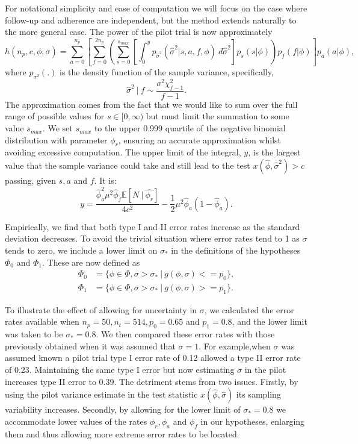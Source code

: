 \documentclass[AMA,STIX1COL]{WileyNJD-v2}
\begin{document}
For notational simplicity and ease of computation we will focus on the case where follow-up and adherence are independent, but the method extends naturally to the more general case. The power of the pilot trial is now approximately 
\begin{equation*}
h(n_p, c, \phi, \sigma) = \sum_{a=0}^{n_p} \left[  \sum_{f=0}^{2n_p} \left( \sum_{s = 0}^{s_{max}} 
\left[ \int_0^y p_{\hat{\sigma}^2}( \hat{\sigma}^2 | s, a, f, \phi) ~ d\hat{\sigma}^2 \right] 
p_s(s | \phi) \right) p_{f}(f |\phi)  \right] p_a(a | \phi),
\end{equation*}
where $p_{\sigma^2}(.)$ is the density function of the sample variance, specifically,
$$
\hat{\sigma}^2 ~|~  f \sim \frac{\sigma^2 \chi^2_{f - 1}}{f - 1}.
$$
The approximation comes from the fact that we would like to sum over the full range of possible values for $s \in [0, \infty)$ but must limit the summation to some value $s_{max}$. We set $s_{max}$ to the upper 0.999 quartile of the negative binomial distribution with parameter $\phi_r$, ensuring an accurate approximation whilst avoiding excessive computation. The upper limit of the integral, $y$, is the largest value that the sample variance could take and still lead to the test $x(\hat{\phi}, \hat{\sigma}^2) > c$ passing, given $s, a$ and $f$. It is:
$$
y = \frac{\hat{\phi}_a^2 \mu^2 \hat{\phi}_f \mathbb{E}[N ~|~ \hat{\phi_r}]}{4c^2} - \frac{1}{2} \mu^2 \hat{\phi}_a (1-\hat{\phi}_a).
$$
 
Empirically, we find that both type I and II error rates increase as the standard deviation decreases. To avoid the trivial situation where error rates tend to 1 as $\sigma$ tends to zero, we include a lower limit on $\sigma_*$ in the definitions of the hypotheses $\Phi_0$ and $\Phi_1$. These are now defined as
\begin{align*}
\Phi_0 &= \{\phi \in \Phi, \sigma > \sigma_*  ~ | ~ g(\phi, \sigma) <= p_0 \}, \\
\Phi_1 &= \{\phi \in \Phi, \sigma > \sigma_* ~ | ~ g(\phi, \sigma) >= p_1 \}.
\end{align*}

To illustrate the effect of allowing for uncertainty in $\sigma$, we calculated the error rates available when $n_p = 50, n_t = 514, p_0 = 0.65$ and $p_1 = 0.8$, and the lower limit was taken to be $\sigma_* = 0.8$. We then compared these error rates with those previously obtained when it was assumed that $\sigma = 1$. For example,when $\sigma$ was assumed known a pilot trial type I error rate of 0.12 allowed a type II error rate of 0.23. Maintaining the same type I error but now estimating $\sigma$ in the pilot increases type II error to 0.39. The detriment stems from two issues. Firstly, by using the pilot variance estimate in the test statistic $x(\hat{\phi}, \hat{\sigma})$ its sampling variability increases. Secondly, by allowing for the lower limit of $\sigma_* = 0.8$ we accommodate lower values of the rates $\phi_r, \phi_a$ and $\phi_f$ in our hypotheses, enlarging them and thus allowing more extreme error rates to be located. 
\end{document}
